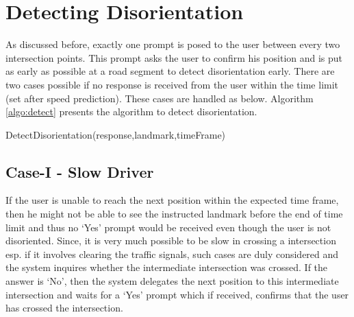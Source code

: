 \documentclass{iitkthesis}
\begin{document}
\section{Detecting Disorientation}
As discussed before, exactly one prompt is posed to the user between every two intersection points. This prompt asks the user to confirm his position and is put as early as possible at a road segment to detect disorientation early. There are two cases possible if no response is received from the user within the time limit (set after speed prediction). These cases are handled as below. Algorithm \ref{algo:detect} presents the algorithm to detect disorientation.


\begin{algorithm}[H]
\label{algo:detect}
\SetVline
\dontprintsemicolon
{}
\BlankLine

\caption{DetectDisorientation(response,landmark,timeFrame)}
\end{algorithm}
\subsection*{Case-I - Slow Driver}
If the user is unable to reach the next position within the expected time frame, then he might not be able to see the instructed landmark before the end of time limit and thus no `Yes' prompt would be received even though the user is not disoriented. Since, it is very much possible to be slow in crossing a intersection esp. if it involves clearing the traffic signals, such cases are duly considered and the system inquires whether the intermediate intersection was crossed. If the answer is `No', then the system delegates the next position to this intermediate intersection and waits for a `Yes' prompt which if received, confirms that the user has crossed the intersection. 
\end{document}

